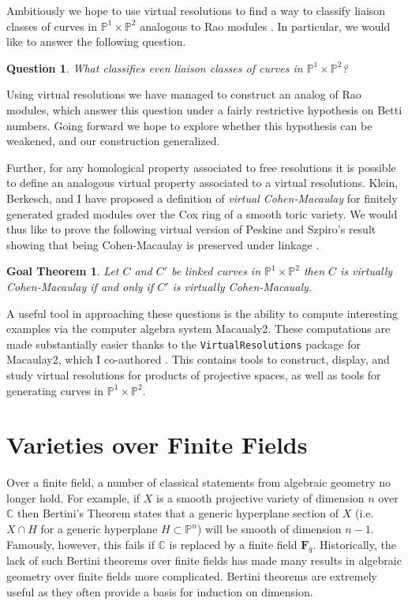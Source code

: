 \documentclass[10pt,reqno]{amsart}
\newtheorem{goalTheorem}[lemma]{Goal Theorem}
\newtheorem{question}[lemma]{Question}
\theoremstyle{remark}
\newcommand{\fF}{\mathbf F}
\newcommand{\C}{\mathbb{C}}
\renewcommand{\P}{\mathbb{P}}
\begin{document}
Ambitiously we hope to use virtual resolutions to find a way to classify liaison classes of curves in $\P^1\times\P^2$ analogous to Rao modules \cite{rao78}. In particular, we would like to answer the following question. 
 
\begin{question}
What classifies even liaison classes of curves in $\P^1\times\P^2$?
\end{question}

Using virtual resolutions we have managed to construct an analog of Rao modules, which answer this question under a fairly restrictive hypothesis on Betti numbers. Going forward we hope to explore whether this hypothesis can be weakened, and our construction generalized. 

Further, for any homological property associated to free resolutions it is possible to define an analogous virtual property associated to a virtual resolutions.  Klein, Berkesch, and I have proposed a definition of \textit{virtual Cohen-Macaulay} for finitely generated graded modules over the Cox ring of a smooth toric variety. We would thus like to prove the following virtual version of Peskine and Szpiro's result showing that being Cohen-Macaulay is preserved under linkage \cite{peskineSzpiro74}. 

\begin{goalTheorem}
Let $C$ and $C'$ be linked curves in $\P^1\times\P^2$ then $C$ is virtually Cohen-Macaulay if and only if $C'$ is virtually Cohen-Macaualy.
\end{goalTheorem}


A useful tool in approaching these questions is the ability to compute interesting examples via the computer algebra system Macaualy2. These computations are made substantially easier thanks to the  \texttt{VirtualResolutions} package for Macaulay2, which I co-authored \cite{almousaBruce19}. This contains tools to construct, display, and study virtual resolutions for products of projective spaces, as well as tools for generating curves in $\P^1\times\P^2$. 

\section{Varieties over Finite Fields}

Over a finite field, a number of classical statements from algebraic geometry no longer hold. For example, if $X$ is a smooth projective variety of dimension $n$ over $\C$ then Bertini's Theorem states that a generic hyperplane section of $X$ (i.e. $X\cap H$ for a generic hyperplane $H\subset \P^n$) will be smooth of dimension $n-1$. Famously, however, this fails if $\C$ is replaced by a finite field $\fF_{q}$. Historically, the lack of such Bertini theorems over finite fields has made many results in algebraic geometry over finite fields more complicated. Bertini theorems are extremely useful as they often provide a basis for induction on dimension.
\end{document}
